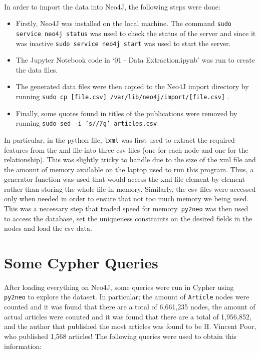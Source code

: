 \paragraph{ }In order to import the data into Neo4J, the following steps were done:
\begin{itemize}
	\item Firstly, Neo4J was installed on the local machine. The command \texttt{sudo service neo4j status} was used to check the status of the server and since it was inactive \texttt{sudo service neo4j start} was used to start the server.
	\item The Jupyter Notebook code in `01 - Data Extraction.ipynb' was run to create the data files.
	\item The generated data files were then copied to the Neo4J import directory by running \texttt{sudo cp [file.csv] /var/lib/neo4j/import/[file.csv]} .
	\item Finally, some quotes found in titles of the publications were removed by running \texttt{sudo sed -i 's/\"//g' articles.csv}
\end{itemize}
In particular, in the python file, \texttt{lxml} was first used to extract the required features from the xml file into three csv files (one for each node and one for the relationship). This was slightly tricky to handle due to the size of the xml file and the amount of memory available on the laptop used to run this program. Thus, a generator function was used that would access the xml file element by element rather than storing the whole file in memory. Similarly, the csv files were accessed only when needed in order to ensure that not too much memory we being used. This was a necessary step that traded speed for memory. \texttt{py2neo} was then used to access the database, set the uniqueness constraints on the desired fields in the nodes and load the csv data.

\section{Some Cypher Queries}
\paragraph{ }After loading everything on Neo4J, some queries were run in Cypher using \texttt{py2neo} to explore the dataset. In particular; the amount of \texttt{Article} nodes were counted and it was found that there are a total of 6,661,235 nodes, the amount of actual articles were counted and it was found that there are a total of 1,956,852, and the author that published the most articles was found to be H. Vincent Poor, who published 1,568 articles! The following queries were used to obtain this information:\\

